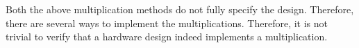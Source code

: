 Both the above multiplication methods do not
fully specify the design.
%
Therefore, there are several ways to implement the multiplications.
%
Therefore, it is not trivial to verify that a hardware design indeed
implements a multiplication.




